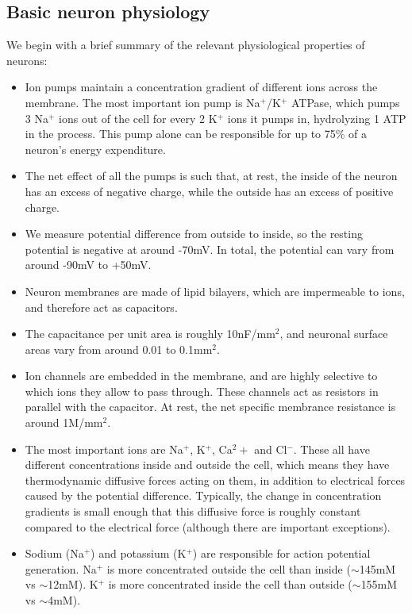 \documentclass{article}
\begin{document}
\subsection{Basic neuron physiology}

We begin with a brief summary of the relevant physiological properties of neurons:\\

\begin{itemize}
    \item Ion pumps maintain a concentration gradient of different ions across the membrane. The most important ion pump is Na$^+$/K$^+$ ATPase, which pumps 3 Na$^+$ ions out of the cell for every 2 K$^+$ ions it pumps in, hydrolyzing 1 ATP in the process. This pump alone can be responsible for up to 75\% of a neuron's energy expenditure.
    \item The net effect of all the pumps is such that, at rest, the inside of the neuron has an excess of negative charge, while the outside has an excess of positive charge.
    \item We measure potential difference from outside to inside, so the resting potential is negative at around -70mV. In total, the potential can vary from around -90mV to +50mV.
    \item Neuron membranes are made of lipid bilayers, which are impermeable to ions, and therefore act as capacitors.
    \item The capacitance per unit area is roughly 10nF/mm$^2$, and neuronal surface areas vary from around 0.01 to 0.1mm$^2$.
    \item Ion channels are embedded in the membrane, and are highly selective to which ions they allow to pass through. These channels act as resistors in parallel with the capacitor. At rest, the net specific membrance resistance is around 1M\Omega/$\text{mm}^2$.
    \item The most important ions are Na$^+$, K$^+$, Ca$^2+$ and Cl$^-$. These all have different concentrations inside and outside the cell, which means they have thermodynamic diffusive forces acting on them, in addition to electrical forces caused by the potential difference. Typically, the change in concentration gradients is small enough that this diffusive force is roughly constant compared to the electrical force (although there are important exceptions).
    \item Sodium (Na$^+$) and potassium (K$^+$) are responsible for action potential generation. Na$^+$ is more concentrated outside the cell than inside ($\sim$145mM vs $\sim$12mM). K$^+$ is more concentrated inside the cell than outside ($\sim$155mM vs $\sim$4mM).

\end{itemize}
\end{document}
